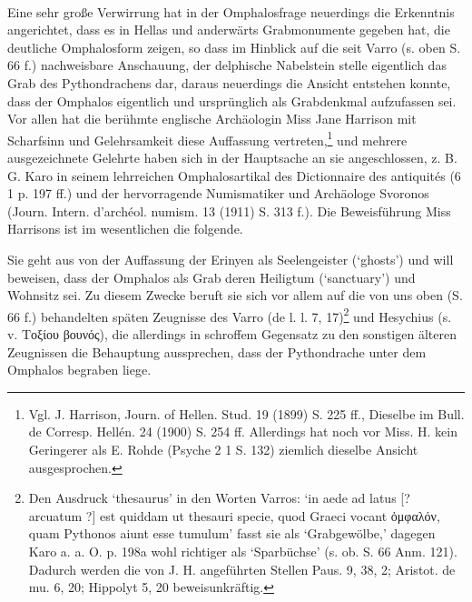 \documentclass[a4paper, 11pt, oneside]{article}
\begin{document}
\paragraph{}
Eine sehr große Verwirrung hat in der Omphalosfrage neuerdings die Erkenntnis angerichtet, dass es in Hellas und anderwärts Grabmonumente gegeben hat, die deutliche Omphalosform zeigen, so dass im Hinblick auf die seit Varro (s. oben S. 66 f.) nachweisbare Anschauung, der delphische Nabelstein stelle eigentlich das Grab des Pythondrachens dar, daraus neuerdings die Ansicht entstehen konnte, dass der Omphalos eigentlich und ursprünglich als Grabdenkmal aufzufassen sei. Vor allen hat die berühmte englische Archäologin Miss Jane Harrison mit Scharfsinn und Gelehrsamkeit diese Auffassung vertreten,\footnote{Vgl. J. Harrison, Journ. of Hellen. Stud. 19 (1899) S. 225 ff., Dieselbe im Bull. de Corresp. Hellén. 24 (1900) S. 254 ff. Allerdings hat noch vor Miss. H. kein Geringerer als E. Rohde (Psyche 2 1 S. 132) ziemlich dieselbe Ansicht ausgesprochen.} und mehrere ausgezeichnete Gelehrte haben sich in der Hauptsache an sie angeschlossen, z. B. G. Karo in seinem lehrreichen Omphalosartikal des Dictionnaire des antiquités (6 1 p. 197 ff.) und der hervorragende Numismatiker und Archäologe Svoronos (Journ. Intern. d'archéol. numism. 13 (1911) S. 313 f.). Die Beweisführung Miss Harrisons ist im wesentlichen die folgende.

Sie geht aus von der Auffassung der Erinyen als Seelengeister (`ghosts') und will beweisen, dass der Omphalos als Grab deren Heiligtum (`sanctuary') und Wohnsitz sei. Zu diesem Zwecke beruft sie sich vor allem auf die von uns oben (S. 66 f.) behandelten späten Zeugnisse des Varro (de l. l. 7, 17)\footnote{Den Ausdruck `thesaurus' in den Worten Varros: `in aede ad latus [? arcuatum ?] est quiddam ut thesauri specie, quod Graeci vocant ὀμφαλόν, quam Pythonos aiunt esse tumulum' fasst sie als `Grabgewölbe,' dagegen Karo a. a. O. p. 198a wohl richtiger als `Sparbüchse' (s. ob. S. 66 Anm. 121). Dadurch werden die von J. H. angeführten Stellen Paus. 9, 38, 2; Aristot. de mu. 6, 20; Hippolyt 5, 20 beweisunkräftig.} und Hesychius (s. v. Τοξίου βουνός), die allerdings in schroffem Gegensatz zu den sonstigen älteren Zeugnissen die Behauptung aussprechen, dass der Pythondrache unter dem Omphalos begraben liege.
\end{document}
